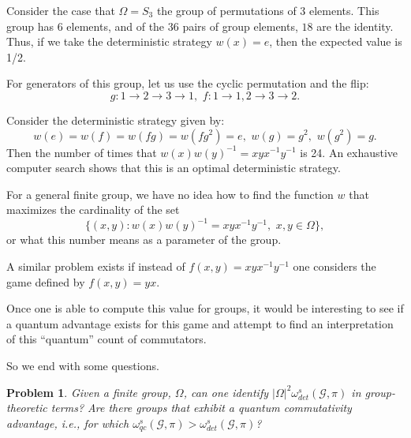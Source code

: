\documentclass[11pt]{amsart}
\newtheorem{prob}[thm]{Problem}
\theoremstyle{definition}
\newcommand{\cl}[1]{\mathcal{#1}}
\begin{document}
Consider the case that $\Omega=S_3$ the group of permutations of 3 elements.  This group has 6 elements, and of the $36$ pairs of group elements, $18$ are the identity. Thus, if we take the deterministic strategy $w(x) = e$, then the expected value is 1/2.

  For generators of this group, let us use the cyclic permutation and the flip:
  \[ g: 1 \to 2 \to 3 \to 1, \,\, f: 1 \to 1, 2\to 3 \to 2.\]

  Consider the deterministic strategy given by:
  \[w(e) = w(f) = w(fg) = w(fg^2) =e, \,\, w(g) = g^2, \,\, w(g^2) =g.\]
  Then the number of times that $w(x) w(y)^{-1} = xyx^{-1} y^{-1}$ is 24.
  An exhaustive computer search shows that this is an optimal deterministic
  strategy.

  For a general finite group, we have no idea how to find the function $w$ that maximizes the cardinality of the set
  \[ \{ (x,y) :  w(x) w(y)^{-1} = xyx^{-1} y^{-1}, \,\, x,y \in \Omega \}, \]
  or what this number means as a parameter of the group.

  A similar problem exists if instead of $f(x,y) = xy x^{-1} y^{-1}$ one considers the game defined by $f(x,y) = yx$.

 Once one is able to compute this value for groups, it would be interesting to see if a quantum advantage exists for this game and attempt to find an interpretation of this ``quantum'' count of commutators.
 
 So we end with some questions.
 
 \begin{prob} Given a finite group, $\Omega$, can one identify $|\Omega|^2 \omega_{det}^s(\cl G, \pi)$ in group-theoretic terms? Are there groups that exhibit a quantum commutativity advantage, i.e., for which $\omega^s_{qc}(\cl G, \pi) > \omega^s_{det}(\cl G, \pi)$?
 \end{prob}
\end{document}
